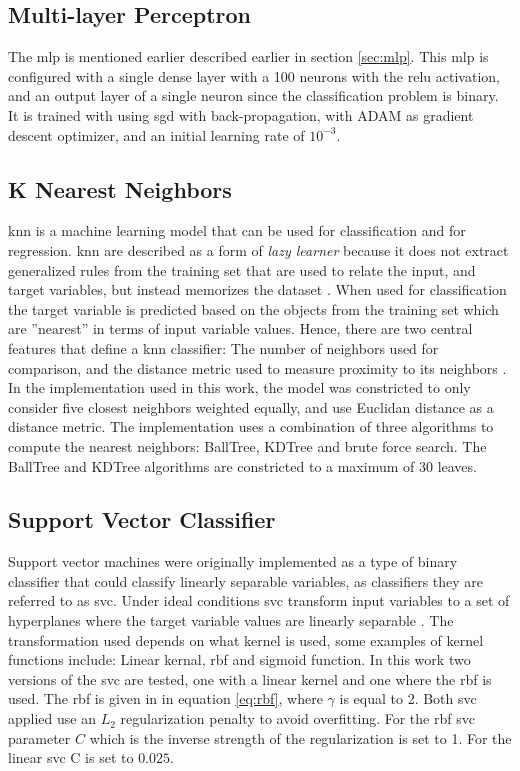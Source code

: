 \subsection{Multi-layer Perceptron}
The \acrshort{mlp} is mentioned earlier described earlier in section \ref{sec:mlp}. This \acrshort{mlp} is configured with a single dense layer with a 100 neurons with the \acrshort{relu} activation, and an output layer of a single neuron since the classification problem is binary. It is trained with using \acrshort{sgd} with back-propagation, with ADAM as gradient descent optimizer, and an initial learning rate of $10^{-3}$.

\subsection{K Nearest Neighbors}
\acrfull{knn} is a machine learning model that can be used for classification and for regression. \acrshort{knn} are described as a form of \textit{lazy learner} because it does not extract generalized rules from the training set that are used to relate the input, and target variables, but instead memorizes the dataset \cite{python_machine_learning_2nd}. When used for classification the target variable is predicted based on the objects from the training set which are ''nearest'' in terms of input variable values. Hence, there are two central features that define a \acrshort{knn} classifier: The number of neighbors used for comparison, and the distance metric used to measure proximity to its neighbors \cite{python_machine_learning_2019}. In the implementation used in this work, the model was constricted to only consider five closest neighbors weighted equally, and use Euclidan distance as a distance metric. The implementation uses a combination of three algorithms to compute the nearest neighbors: BallTree, KDTree and brute force search. The BallTree and KDTree algorithms are constricted to a maximum of 30 leaves.

\subsection{Support Vector Classifier}
Support vector machines were originally implemented as a type of binary classifier that could classify linearly separable variables, as classifiers they are referred to as \acrfull{svc}. Under ideal conditions \acrshort{svc} transform input variables to a set of hyperplanes where the target variable values are linearly separable \cite{svm_wikipedia}. The transformation used depends on what kernel is used, some examples of kernel functions include: Linear kernal, \acrfull{rbf} and sigmoid function. In this work two versions of the \acrshort{svc} are tested, one with a linear kernel and one where the \acrshort{rbf} is used. The \acrshort{rbf} is given in in equation \eqref{eq:rbf}, where $\gamma$ is equal to 2. Both \acrshort{svc} applied use an $L_2$ regularization penalty to avoid overfitting. For the \acrshort{rbf} \acrshort{svc} parameter $C$ which is the inverse strength of the regularization is set to 1. For the linear \acrshort{svc} C is set to $0.025$.

